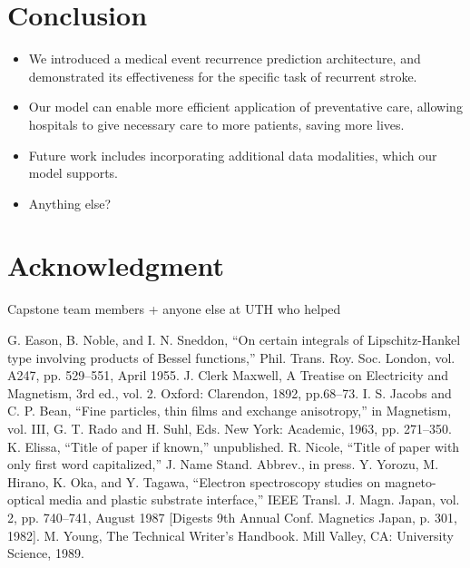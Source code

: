\documentclass[conference]{IEEEtran}
\begin{document}
\section{Conclusion}

\begin{itemize}
    \item We introduced a medical event recurrence prediction architecture, and demonstrated its effectiveness for the specific task of recurrent stroke.
    \item Our model can enable more efficient application of preventative care, allowing hospitals to give necessary care to more patients, saving more lives.
    \item Future work includes incorporating additional data modalities, which our model supports.
    \item Anything else?
\end{itemize}

\section*{Acknowledgment}

Capstone team members + anyone else at UTH who helped

\begin{thebibliography}{00}
 G. Eason, B. Noble, and I. N. Sneddon, ``On certain integrals of Lipschitz-Hankel type involving products of Bessel functions,'' Phil. Trans. Roy. Soc. London, vol. A247, pp. 529--551, April 1955.
 J. Clerk Maxwell, A Treatise on Electricity and Magnetism, 3rd ed., vol. 2. Oxford: Clarendon, 1892, pp.68--73.
 I. S. Jacobs and C. P. Bean, ``Fine particles, thin films and exchange anisotropy,'' in Magnetism, vol. III, G. T. Rado and H. Suhl, Eds. New York: Academic, 1963, pp. 271--350.
 K. Elissa, ``Title of paper if known,'' unpublished.
 R. Nicole, ``Title of paper with only first word capitalized,'' J. Name Stand. Abbrev., in press.
 Y. Yorozu, M. Hirano, K. Oka, and Y. Tagawa, ``Electron spectroscopy studies on magneto-optical media and plastic substrate interface,'' IEEE Transl. J. Magn. Japan, vol. 2, pp. 740--741, August 1987 [Digests 9th Annual Conf. Magnetics Japan, p. 301, 1982].
 M. Young, The Technical Writer's Handbook. Mill Valley, CA: University Science, 1989.
\end{thebibliography}
\end{document}
